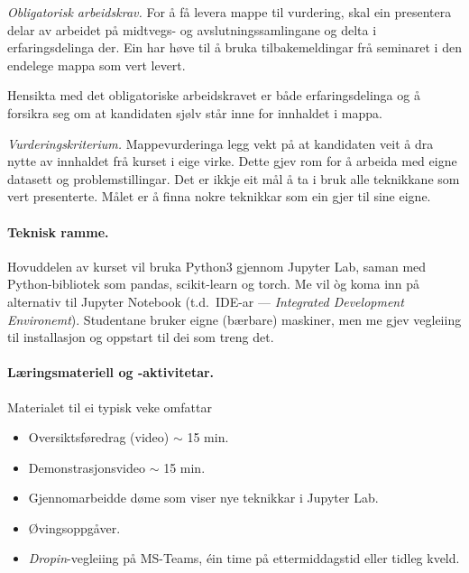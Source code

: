 \documentclass[nynorsk]{scrartcl}
\begin{document}
\emph{Obligatorisk arbeidskrav.}
For å få levera mappe til vurdering, skal ein presentera delar av arbeidet på
midtvegs- og avslutningssamlingane og delta i erfaringsdelinga der.
Ein har høve til å bruka tilbakemeldingar frå seminaret i den endelege mappa
som vert levert.

Hensikta med det obligatoriske arbeidskravet er både erfaringsdelinga
og å forsikra seg om at kandidaten sjølv står inne for innhaldet i mappa.

\emph{Vurderingskriterium.}
Mappevurderinga legg vekt på at kandidaten veit å dra nytte av innhaldet
frå kurset i eige virke.
Dette gjev rom for å arbeida med eigne datasett og problemstillingar.
Det er ikkje eit mål å ta i bruk alle teknikkane som vert presenterte.
Målet er å finna nokre teknikkar som ein gjer til sine eigne.

\paragraph{Teknisk ramme.}
Hovuddelen av kurset vil bruka Python3 gjennom Jupyter Lab, saman med
Python-bibliotek som pandas, scikit-learn og torch.  
Me vil òg koma inn på alternativ til Jupyter Notebook (t.d.\ IDE-ar 
--- \emph{Integrated Development Environemt}).
Studentane bruker eigne (bærbare) maskiner, men me gjev vegleiing til installasjon
og oppstart til dei som treng det.

\paragraph{Læringsmateriell og -aktivitetar.}
Materialet til ei typisk veke omfattar
\begin{itemize}
        \item Oversiktsføredrag (video) $\sim$ 15 min.
        \item Demonstrasjonsvideo $\sim$ 15 min.
        \item Gjennomarbeidde døme som viser nye teknikkar i Jupyter Lab.
        \item Øvingsoppgåver.
	\item \emph{Dropin}-vegleiing på MS-Teams, éin time på ettermiddagstid 
	   eller tidleg kveld.
\end{itemize}
\end{document}
